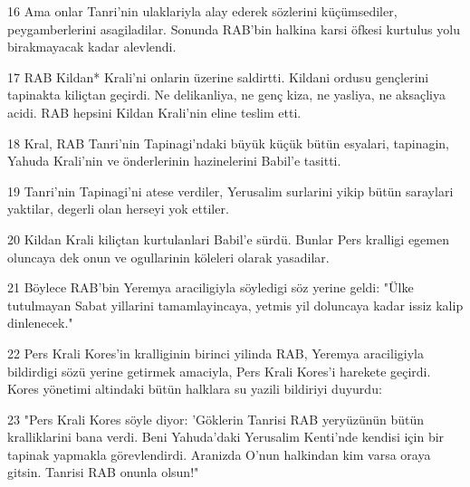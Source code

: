 \par 16 Ama onlar Tanri'nin ulaklariyla alay ederek sözlerini küçümsediler, peygamberlerini asagiladilar. Sonunda RAB'bin halkina karsi öfkesi kurtulus yolu birakmayacak kadar alevlendi.
\par 17 RAB Kildan* Krali'ni onlarin üzerine saldirtti. Kildani ordusu gençlerini tapinakta kiliçtan geçirdi. Ne delikanliya, ne genç kiza, ne yasliya, ne aksaçliya acidi. RAB hepsini Kildan Krali'nin eline teslim etti.
\par 18 Kral, RAB Tanri'nin Tapinagi'ndaki büyük küçük bütün esyalari, tapinagin, Yahuda Krali'nin ve önderlerinin hazinelerini Babil'e tasitti.
\par 19 Tanri'nin Tapinagi'ni atese verdiler, Yerusalim surlarini yikip bütün saraylari yaktilar, degerli olan herseyi yok ettiler.
\par 20 Kildan Krali kiliçtan kurtulanlari Babil'e sürdü. Bunlar Pers kralligi egemen oluncaya dek onun ve ogullarinin köleleri olarak yasadilar.
\par 21 Böylece RAB'bin Yeremya araciligiyla söyledigi söz yerine geldi: "Ülke tutulmayan Sabat yillarini tamamlayincaya, yetmis yil doluncaya kadar issiz kalip dinlenecek."
\par 22 Pers Krali Kores'in kralliginin birinci yilinda RAB, Yeremya araciligiyla bildirdigi sözü yerine getirmek amaciyla, Pers Krali Kores'i harekete geçirdi. Kores yönetimi altindaki bütün halklara su yazili bildiriyi duyurdu:
\par 23 "Pers Krali Kores söyle diyor: 'Göklerin Tanrisi RAB yeryüzünün bütün kralliklarini bana verdi. Beni Yahuda'daki Yerusalim Kenti'nde kendisi için bir tapinak yapmakla görevlendirdi. Aranizda O'nun halkindan kim varsa oraya gitsin. Tanrisi RAB onunla olsun!"



